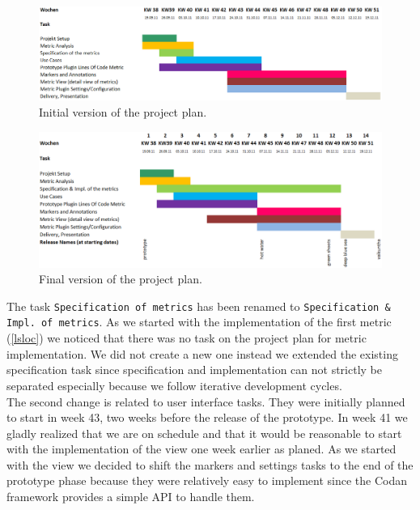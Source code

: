 \documentclass[11pt,a4paper,oneside]{scrreprt}
\begin{document}
\begin{figure}[h!tbp]
  \centering
\includegraphics[width=\textwidth]{figures/schedule_start.png}
\caption{Initial version of the project plan.}
\label{fig:schedule_start}
\end{figure}

\begin{figure}[h!tbp]
  \centering
\includegraphics[width=\textwidth]{figures/schedule_end.png}
\caption{Final version of the project plan.}
\label{fig:schedule_end}
\end{figure}


The task \texttt{Specification of metrics} has been renamed to \texttt{Specification \& Impl. of metrics}. As we started with the implementation of the first metric (\ref{lsloc}) we noticed that there was no task on the project plan for metric implementation. We did not create a new one instead we extended the existing specification task since specification and implementation can not strictly be separated especially because we follow iterative development cycles.\\
The second change is related to user interface tasks. They were initially planned to start in week 43, two weeks before the release of the prototype. In week 41 we gladly realized that we are on schedule and that it would be reasonable to start with the implementation of the view one week earlier as planed. As we started with the view we decided to shift the markers and settings tasks to the end of the prototype phase because they were relatively easy to implement since the Codan framework provides a simple API to handle them.
\end{document}
